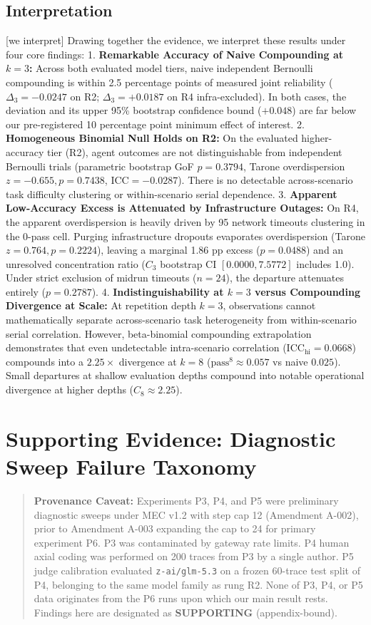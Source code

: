 \documentclass[11pt,letterpaper]{article}
\begin{document}
\subsection{Interpretation}
[we interpret] Drawing together the evidence, we interpret these results under four core findings:
1. \textbf{Remarkable Accuracy of Naive Compounding at $k=3$:} Across both evaluated model tiers, naive independent Bernoulli compounding is within 2.5 percentage points of measured joint reliability ($\Delta_3 = -0.0247$ on R2; $\Delta_3 = +0.0187$ on R4 infra-excluded). In both cases, the deviation and its upper 95\% bootstrap confidence bound ($+0.048$) are far below our pre-registered 10 percentage point minimum effect of interest.
2. \textbf{Homogeneous Binomial Null Holds on R2:} On the evaluated higher-accuracy tier (R2), agent outcomes are not distinguishable from independent Bernoulli trials (parametric bootstrap GoF $p = 0.3794$, Tarone overdispersion $z = -0.655, p = 0.7438$, $\text{ICC} = -0.0287$). There is no detectable across-scenario task difficulty clustering or within-scenario serial dependence.
3. \textbf{Apparent Low-Accuracy Excess is Attenuated by Infrastructure Outages:} On R4, the apparent overdispersion is heavily driven by 95 network timeouts clustering in the 0-pass cell. Purging infrastructure dropouts evaporates overdispersion (Tarone $z = 0.764, p = 0.2224$), leaving a marginal 1.86 pp excess ($p = 0.0488$) and an unresolved concentration ratio ($C_3$ bootstrap CI $[0.0000, 7.5772]$ includes 1.0). Under strict exclusion of midrun timeouts ($n=24$), the departure attenuates entirely ($p = 0.2787$).
4. \textbf{Indistinguishability at $k=3$ versus Compounding Divergence at Scale:} At repetition depth $k=3$, observations cannot mathematically separate across-scenario task heterogeneity from within-scenario serial correlation. However, beta-binomial compounding extrapolation demonstrates that even undetectable intra-scenario correlation ($\text{ICC}_{\text{hi}} = 0.0668$) compounds into a $2.25\times$ divergence at $k=8$ ($\text{pass}^8 \approx 0.057$ vs naive $0.025$). Small departures at shallow evaluation depths compound into notable operational divergence at higher depths ($C_8 \approx 2.25$).



\section{Supporting Evidence: Diagnostic Sweep Failure Taxonomy}
\begin{quote}
\textbf{Provenance Caveat:} Experiments P3, P4, and P5 were preliminary diagnostic sweeps under MEC v1.2 with step cap 12 (Amendment A-002), prior to Amendment A-003 expanding the cap to 24 for primary experiment P6. P3 was contaminated by gateway rate limits. P4 human axial coding was performed on 200 traces from P3 by a single author. P5 judge calibration evaluated \texttt{z-ai/glm-5.3} on a frozen 60-trace test split of P4, belonging to the same model family as rung R2. None of P3, P4, or P5 data originates from the P6 runs upon which our main result rests. Findings here are designated as \textbf{SUPPORTING} (appendix-bound).
\end{quote}
\end{document}
